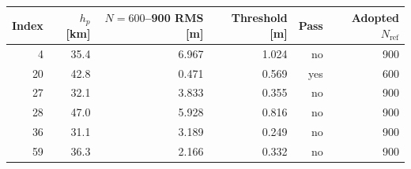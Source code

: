 \begin{tabular}{rrrrrr}
\toprule
Index & $h_p$ [km] & $N=600$--900 RMS [m] & Threshold [m] & Pass & Adopted $N_{\mathrm{ref}}$ \\
\midrule
4 & 35.4 & 6.967 & 1.024 & no & 900 \\
20 & 42.8 & 0.471 & 0.569 & yes & 600 \\
27 & 32.1 & 3.833 & 0.355 & no & 900 \\
28 & 47.0 & 5.928 & 0.816 & no & 900 \\
36 & 31.1 & 3.189 & 0.249 & no & 900 \\
59 & 36.3 & 2.166 & 0.332 & no & 900 \\
\bottomrule
\end{tabular}
